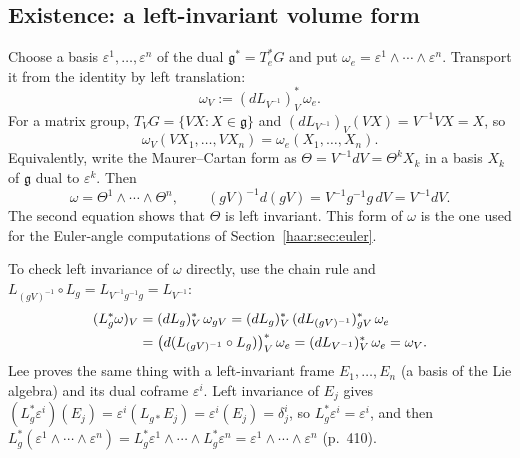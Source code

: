 \subsection{Existence: a left-invariant volume form}
Choose a basis $\varepsilon^1,\dots,\varepsilon^n$ of the dual
$\mathfrak g^*=T_e^*G$ and put $\omega_e=\varepsilon^1\wedge\cdots\wedge
\varepsilon^n$. Transport it from the identity by left translation:
\begin{equation}\label{haar:omega-def}
 \omega_V:=(dL_{V^{-1}})_V^*\,\omega_e .
\end{equation}
For a matrix group, $T_VG=\{VX:X\in\mathfrak g\}$ and
$(dL_{V^{-1}})_V(VX)=V^{-1}VX=X$, so
\begin{equation}\label{haar:omega-matrix}
 \omega_V(VX_1,\dots,VX_n)=\omega_e(X_1,\dots,X_n).
\end{equation}
Equivalently, write the Maurer--Cartan form as
$\Theta=V^{-1}dV=\Theta^kX_k$ in a basis $X_k$ of $\mathfrak g$ dual to
$\varepsilon^k$. Then
\begin{equation}\label{haar:maurer-cartan}
 \omega=\Theta^1\wedge\cdots\wedge\Theta^n,\qquad
 (gV)^{-1}d(gV)=V^{-1}g^{-1}g\,dV=V^{-1}dV .
\end{equation}
The second equation shows that $\Theta$ is left invariant. This form of
$\omega$ is the one used for the Euler-angle computations of
Section~\ref{haar:sec:euler}.

To check left invariance of $\omega$ directly, use the chain rule and
$L_{(gV)^{-1}}\circ L_g=L_{V^{-1}g^{-1}g}=L_{V^{-1}}$:
\begin{align}
 (L_g^*\omega)_V&=(dL_g)_V^*\,\omega_{gV}
 =(dL_g)_V^*\,(dL_{(gV)^{-1}})_{gV}^*\,\omega_e\notag\\
 &=\big(d(L_{(gV)^{-1}}\circ L_g)\big)_V^*\,\omega_e
 =(dL_{V^{-1}})_V^*\,\omega_e=\omega_V .\label{haar:left-invariant-form}
\end{align}
Lee proves the same thing with a left-invariant frame $E_1,\dots,E_n$
(a basis of the Lie algebra) and its dual coframe $\varepsilon^i$. Left
invariance of $E_j$ gives
$(L_g^*\varepsilon^i)(E_j)=\varepsilon^i(L_{g*}E_j)=\varepsilon^i(E_j)
=\delta^i_j$, so $L_g^*\varepsilon^i=\varepsilon^i$, and then
$L_g^*(\varepsilon^1\wedge\cdots\wedge\varepsilon^n)
=L_g^*\varepsilon^1\wedge\cdots\wedge L_g^*\varepsilon^n
=\varepsilon^1\wedge\cdots\wedge\varepsilon^n$ (p.~410).

